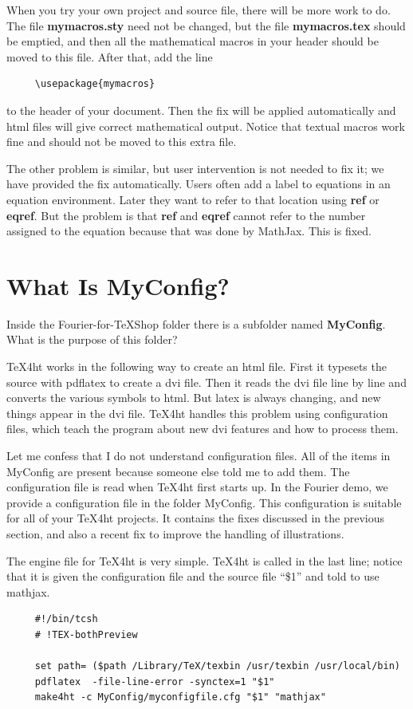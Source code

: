 \documentclass[11pt, oneside]{article}   	%
\begin{document}
\newpage
When you try your own project and source file, there will be more work to do. The file
{\bf mymacros.sty} need not be changed, but the file {\bf mymacros.tex} should be emptied,
and then all the mathematical macros in your header should be moved to this file.  After that,
add the line
\begin{verbatim}
     \usepackage{mymacros}
\end{verbatim}
to the header of your document.
Then the fix will be applied automatically and html files will give correct mathematical
output. Notice that textual macros work fine and should not be moved to this extra file.

The other problem is similar, but user intervention is not needed to fix it; we have provided
the fix automatically. Users often add a label to equations in an equation environment.
Later they want to refer to that location using {\bf ref} or {\bf eqref}. But the problem is that {\bf ref}
and {\bf eqref} cannot refer to the number assigned to the equation because that was done by MathJax.
This is fixed.


\section{What Is MyConfig?}

Inside the Fourier-for-TeXShop folder there is a subfolder named {\bf MyConfig}. What is the purpose of this folder?

TeX4ht works in the following way to create an html file. First it typesets the source with pdflatex to create a dvi file. Then it reads the dvi file line by line and converts the various symbols to html. But latex is always changing, and new things appear in the dvi file. TeX4ht handles this problem using configuration files,
which teach the program about new dvi features and how to process them. 

Let me confess that I do not understand configuration files. All of the items in MyConfig are present because someone else told me to add them. The configuration file is read when TeX4ht first starts up. 
In the Fourier demo, we provide a configuration file in the folder MyConfig. This configuration is
suitable for all of your TeX4ht projects. It contains the fixes discussed in the previous section,
and also a recent fix to improve the handling of illustrations.

\newpage


The
engine file for TeX4ht is very simple. TeX4ht is called in the last line; notice that it is given
the configuration file and the source file ``\$1'' and told to use mathjax.
\begin{verbatim}
     #!/bin/tcsh
     # !TEX-bothPreview

     set path= ($path /Library/TeX/texbin /usr/texbin /usr/local/bin)
     pdflatex  -file-line-error -synctex=1 "$1"
     make4ht -c MyConfig/myconfigfile.cfg "$1" "mathjax"
\end{verbatim}
\end{document}
